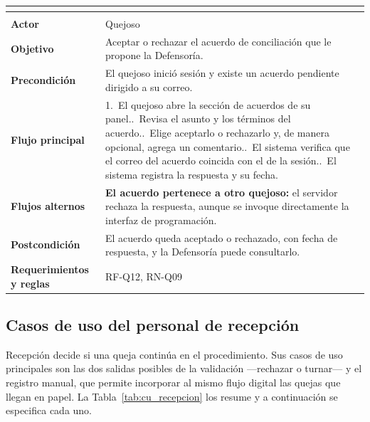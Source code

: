 \begingroup
{}
\small
\renewcommand{\arraystretch}{1.25}
\setlength{\tabcolsep}{4pt}
\begin{longtable}{|L{3.2cm}|L{12.4cm}|}
	\hline
	 \\
	\hline
	\endfirsthead
	\hline
	 \\
	\hline
	\endhead
	\textbf{Actor} & Quejoso \\ \hline
	\textbf{Objetivo} & Aceptar o rechazar el acuerdo de conciliación que le propone la Defensoría. \\ \hline
	\textbf{Precondición} & El quejoso inició sesión y existe un acuerdo pendiente dirigido a su correo. \\ \hline
	\textbf{Flujo principal} & 1.~El quejoso abre la sección de acuerdos de su panel..~Revisa el asunto y los términos del acuerdo..~Elige aceptarlo o rechazarlo y, de manera opcional, agrega un comentario..~El sistema verifica que el correo del acuerdo coincida con el de la sesión..~El sistema registra la respuesta y su fecha. \\ \hline
	\textbf{Flujos alternos} & \textbf{El acuerdo pertenece a otro quejoso:} el servidor rechaza la respuesta, aunque se invoque directamente la interfaz de programación. \\ \hline
	\textbf{Postcondición} & El acuerdo queda aceptado o rechazado, con fecha de respuesta, y la Defensoría puede consultarlo. \\ \hline
	\textbf{Requerimientos y reglas} & RF-Q12, RN-Q09 \\ \hline
\end{longtable}
\endgroup

\subsection{Casos de uso del personal de recepción}
Recepción decide si una queja continúa en el procedimiento. Sus casos de uso principales son las dos salidas posibles de la validación ---rechazar o turnar--- y el registro manual, que permite incorporar al mismo flujo digital las quejas que llegan en papel. La Tabla~\ref{tab:cu_recepcion} los resume y a continuación se especifica cada uno.

